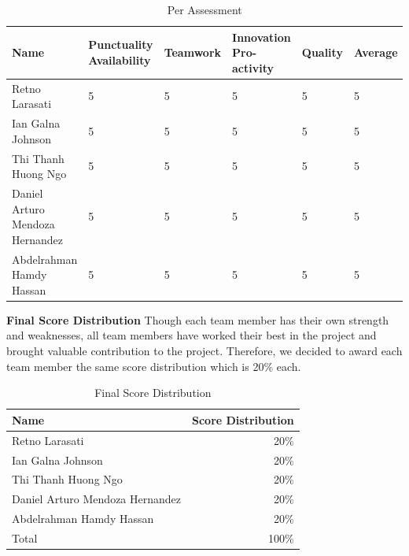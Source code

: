 \documentclass[11pt]{article}
\begin{document}
{\begin{enumerate}
\begin{table}[H]
    \centering
    \begin{tabular}{p{4cm}|p{2cm}|p{2cm}|p{2cm}|p{2cm}|p{2cm}}
         \textbf{Name} & \textbf{Punctuality 
                                Availability} &  \textbf{Teamwork} & \textbf{Innovation  Pro-activity} & \textbf{Quality} &\textbf{Average}  \\ \hline
         Retno Larasati & 5 & 5 & 5 & 5   & 5           \\ \hline
         Ian Galna Johnson &5 & 5 & 5 & 5 & 5           \\ \hline
         Thi Thanh Huong Ngo & 5 & 5 & 5 & 5 & 5       \\ \hline   
         Daniel Arturo Mendoza Hernandez & 5 & 5 & 5 & 5 & 5  \\ \hline
         Abdelrahman Hamdy Hassan  & 5 & 5 & 5 & 5  & 5 \\ \hline
    \end{tabular}
    \caption{Per Assessment}
    \label{tab:assessment}
\end{table}

\textbf{Final Score Distribution} \newline
Though each team member has their own strength and weaknesses, all team members have worked their best in the project and brought valuable contribution to the project. Therefore, we decided to award each team member the same score distribution which is 20\% each. 

\begin{table}[H]
    \centering
    \begin{tabular}{l|r}
         \textbf{Name} & \textbf{Score Distribution}  \\ \hline
         Retno Larasati & 20\%           \\ \hline
         Ian Galna Johnson & 20\%           \\ \hline
         Thi Thanh Huong Ngo & 20\%        \\ \hline   
         Daniel Arturo Mendoza Hernandez & 20\%  \\ \hline
         Abdelrahman Hamdy Hassan  & 20\%  \\ \hline
         Total & 100\% \\
    \end{tabular}
    \caption{Final Score Distribution}
    \label{tab:finalscore}
\end{table}

	
\newpage







\end{enumerate}}
\end{document}
